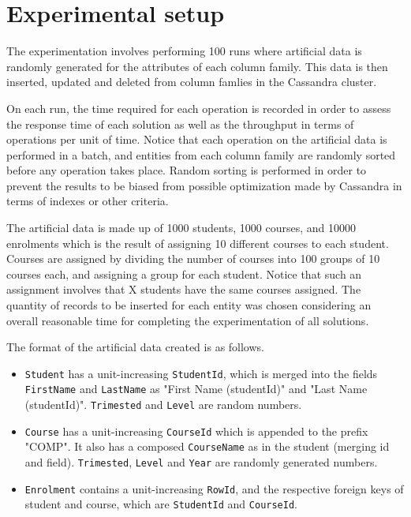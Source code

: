 \section{Experimental setup}\label{sexp:ExperimentalSetup}


The experimentation involves performing 100 runs where artificial data is
randomly generated for the attributes of each column family. 
This data is then inserted,
updated and deleted from column famlies in the Cassandra cluster.

On each run, the time required for each operation is recorded in order to assess
the response time of each solution as well as the throughput in terms of
operations per unit of time. Notice that each operation on the artificial data 
is performed in a batch, and entities from each column family are randomly
sorted before any operation takes place. Random sorting is performed in order to
prevent the results to be biased from possible optimization made by Cassandra in
terms of indexes or other criteria.
		
The artificial data is made up of 1000 students, 1000 courses, and 10000
enrolments which is the result of assigning 10 different courses to each
student. Courses are assigned by dividing the number of courses
into 100 groups of 10 courses each, and assigning a group for each student.
Notice that such an assignment involves that X students have the same courses
assigned. The quantity of records to be inserted for each entity was chosen
considering an overall reasonable time for completing the experimentation of all
solutions.
		
The format of the artificial data created is as follows. 
	\begin{itemize}
	  
		  \item \texttt{Student} has a
		unit-increasing \texttt{StudentId}, which is merged into the fields \texttt{FirstName}
		 and \texttt{LastName} as "First Name (studentId)" and "Last Name
		(studentId)". \texttt{Trimested} and \texttt{Level} are random numbers.
		
		\item  \texttt{Course} has a unit-increasing \texttt{CourseId} which is
		appended to the prefix "COMP". It also has a composed \texttt{CourseName} as
		in the student (merging id and field). \texttt{Trimested}, \texttt{Level} and
		\texttt{Year} are randomly generated numbers.
		
		\item  \texttt{Enrolment} contains a unit-increasing \texttt{RowId}, and the
		respective foreign keys of student and course, which are \texttt{StudentId}
		and \texttt{CourseId}.
		
	\end{itemize}

